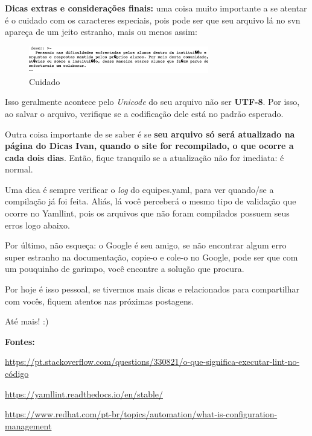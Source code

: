 \textbf{Dicas extras e considerações finais:} uma coisa muito importante a se atentar é o cuidado com os caracteres especiais, pois pode ser que seu arquivo lá no \acs{svn} apareça de um jeito estranho, mais ou menos assim:

\begin{figure}[htb]
        \centering
        \caption{Cuidado}
        \includegraphics[width=0.7\textwidth]{anexos/Imagens_Blog/cuidados.png}
        \end{figure}
        \FloatBarrier

Isso geralmente acontece pelo \textit{Unicode} do seu arquivo não ser \textbf{UTF-8}. Por isso, ao salvar o arquivo, verifique se a codificação dele está no padrão esperado.

Outra coisa importante de se saber é se \textbf{seu arquivo só será atualizado na página do Dicas Ivan, quando o site for recompilado, o que ocorre a cada dois dias}. Então, fique tranquilo se a atualização não for imediata: é normal. 

Uma dica é sempre verificar o \textit{log} do equipes.yaml, para ver quando/se a compilação já foi feita. Aliás, lá você perceberá o mesmo tipo de validação que ocorre no \gls{Yamllint}, pois os arquivos que não foram compilados possuem seus erros logo abaixo.

Por último, não esqueça: o Google é seu amigo, se não encontrar algum erro super estranho na documentação, copie-o e cole-o no Google, pode ser que com um pouquinho de garimpo, você encontre a solução que procura.

Por hoje é isso pessoal, se tivermos mais dicas e relacionados para compartilhar com vocês, fiquem atentos nas próximas postagens.

Até mais! :) 

\textbf{Fontes:}

\noindent\href{https://pt.stackoverflow.com/questions/330821/o-que-significa-executar-lint-no-código}{https://pt.stackoverflow.com/questions/330821/o-que-significa-executar-lint-no-código}

\noindent\href{https://yamllint.readthedocs.io/en/stable/}{https://yamllint.readthedocs.io/en/stable/}

\noindent\href{https://www.redhat.com/pt-br/topics/automation/what-is-configuration-management}{https://www.redhat.com/pt-br/topics/automation/what-is-configuration-management}

